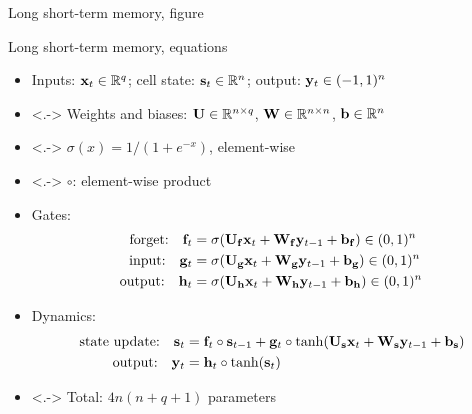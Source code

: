 \begin{frame}{Long short-term memory, figure}
    \centering
    
\end{frame}

\begin{frame}{Long short-term memory, equations}
    \begin{itemize}
        \item<+-> Inputs: $\mathbf{x}_t \in \mathbb{R}^q$; cell state: $\mathbf{s}_t \in \mathbb{R}^n$; output: $\mathbf{y}_t \in (-1, 1)^n$
        \item<.-> Weights and biases: $\mathbf{U} \in \mathbb{R}^{n \times q}$, $\mathbf{W} \in \mathbb{R}^{n \times n}$, $\mathbf{b} \in \mathbb{R}^n$
        \item<.-> $\sigma(x) = 1 / (1 + e^{-x})$, element-wise
        \item<.-> $\circ$: element-wise product
        \item<+-> Gates:
        \begin{align*}
            \text{forget:} \quad \mathbf{f}_t &= \sigma(\mathbf{U}_{\mathbf{f}} \mathbf{x}_t + \mathbf{W}_{\mathbf{f}} \mathbf{y}_{t-1} + \mathbf{b}_{\mathbf{f}}) \in (0, 1)^n \\
            \text{input:} \quad \mathbf{g}_t &= \sigma(\mathbf{U}_{\mathbf{g}} \mathbf{x}_t + \mathbf{W}_{\mathbf{g}} \mathbf{y}_{t-1} + \mathbf{b}_{\mathbf{g}}) \in (0, 1)^n \\
            \text{output:} \quad \mathbf{h}_t &= \sigma(\mathbf{U}_{\mathbf{h}} \mathbf{x}_t + \mathbf{W}_{\mathbf{h}} \mathbf{y}_{t-1} + \mathbf{b}_{\mathbf{h}}) \in (0, 1)^n
        \end{align*}
        \item<+-> Dynamics:
        \begin{align*}
            \text{state update:} \quad \mathbf{s}_t &= \mathbf{f}_t \circ \mathbf{s}_{t-1} + \mathbf{g}_t \circ \tanh(\mathbf{U}_{\mathbf{s}} \mathbf{x}_t + \mathbf{W}_{\mathbf{s}} \mathbf{y}_{t-1} + \mathbf{b}_{\mathbf{s}}) \\
            \text{output:} \quad \mathbf{y}_t &= \mathbf{h}_t \circ \tanh(\mathbf{s}_t)
        \end{align*}
        \item<.-> Total: $4 n (n + q + 1)$ parameters
    \end{itemize}
\end{frame}

